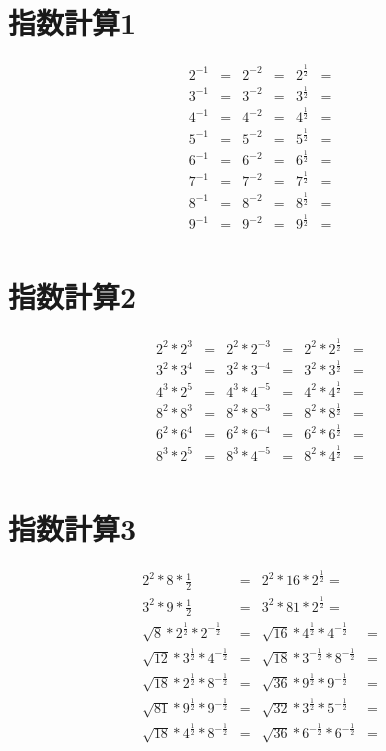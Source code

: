 \documentclass[paper=b4j,landscape,twocolumn,fleqn]{jlreq}
\begin{document}
\section{指数計算1}
\begin{align*}
  2^{-1}&= & 2^{-2}&= & 2^{\frac{1}{2}}&=\\
  3^{-1}&= & 3^{-2}&= & 3^{\frac{1}{2}}&=\\
  4^{-1}&= & 4^{-2}&= & 4^{\frac{1}{2}}&=\\
  5^{-1}&= & 5^{-2}&= & 5^{\frac{1}{2}}&=\\
  6^{-1}&= & 6^{-2}&= & 6^{\frac{1}{2}}&=\\
  7^{-1}&= & 7^{-2}&= & 7^{\frac{1}{2}}&=\\
  8^{-1}&= & 8^{-2}&= & 8^{\frac{1}{2}}&=\\
  9^{-1}&= & 9^{-2}&= & 9^{\frac{1}{2}}&=\\
\end{align*}
\section{指数計算2}
\begin{align*}
  2^2*2^3&= & 2^2*2^{-3}&= & 2^2*2^{\frac{1}{2}}&=\\
  3^2*3^4&= & 3^2*3^{-4}&= & 3^2*3^{\frac{1}{2}}&=\\
  4^3*2^5&= & 4^3*4^{-5}&= & 4^2*4^{\frac{1}{2}}&=\\
  8^2*8^3&= & 8^2*8^{-3}&= & 8^2*8^{\frac{1}{2}}&=\\
  6^2*6^4&= & 6^2*6^{-4}&= & 6^2*6^{\frac{1}{2}}&=\\
  8^3*2^5&= & 8^3*4^{-5}&= & 8^2*4^{\frac{1}{2}}&=\\
\end{align*}
\section{指数計算3}
\begin{align*}
  2^2*8*\frac{1}{2} &= & 2^2*16*2^{\frac{1}{2}}= \\
  3^2*9*\frac{1}{2} &= & 3^2*81*2^{\frac{1}{2}}= \\
  \sqrt{8}*2^{\frac{1}{2}}*2^{-\frac{1}{2}} &= & \sqrt{16}*4^{\frac{1}{2}}*4^{-\frac{1}{2}}&= \\
  \sqrt{12}*3^{\frac{1}{2}}*4^{-\frac{1}{2}} &= & \sqrt{18}*3^{-\frac{1}{2}}*8^{-\frac{1}{2}}&= \\
  \sqrt{18}*2^{\frac{1}{2}}*8^{-\frac{1}{2}} &= & \sqrt{36}*9^{\frac{1}{2}}*9^{-\frac{1}{2}}&= \\
  \sqrt{81}*9^{\frac{1}{2}}*9^{-\frac{1}{2}} &= & \sqrt{32}*3^{\frac{1}{2}}*5^{-\frac{1}{2}}&= \\
  \sqrt{18}*4^{\frac{1}{2}}*8^{-\frac{1}{2}} &= & \sqrt{36}*6^{-\frac{1}{2}}*6^{-\frac{1}{2}}&= \\
\end{align*}
\end{document}
